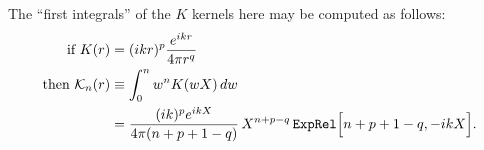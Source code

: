 \documentclass[letterpaper]{article}
\begin{document}
The ``first integrals'' of the $K$ kernels here may be computed
as follows:
\begin{align*}
 \text{if  } K(r) &= (ikr)^p \frac{e^{ikr}}{4\pi r^q} 
\\
 \text{then  } \mathcal{K}_n(r) &\equiv\int_0^n w^n K(wX) \, dw
\\
 &=\frac{(ik)^p e^{ikX}}{4\pi(n+p+1-q)}\, X^{n+p-q} \,
   \texttt{ExpRel}\Big[n+p+1-q, -ikX\Big].
\end{align*}

\newpage


\end{document}
